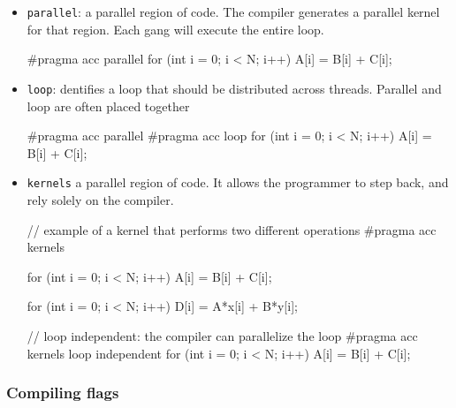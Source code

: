 \begin{itemize}
\item \texttt{parallel}: a parallel region of code. The compiler generates a parallel kernel for that region. Each gang will execute the entire loop.

\begin{codeblock}[language=C]
#pragma acc parallel
{
    for (int i = 0; i < N; i++)
        A[i] = B[i] + C[i];
}
\end{codeblock}

\item \texttt{loop}: dentiﬁes a loop that should be distributed across threads. Parallel and loop are often placed together

\begin{codeblock}[language=C]
#pragma acc parallel
{
    #pragma acc loop
    for (int i = 0; i < N; i++)
        A[i] = B[i] + C[i];
}
\end{codeblock}

\item \texttt{kernels} a parallel region of code. It allows the programmer to step back, and rely solely on the compiler.

\begin{codeblock}[language=C]
// example of a kernel that performs two different operations
#pragma acc kernels
{
    for (int i = 0; i < N; i++)
        A[i] = B[i] + C[i];

    for (int i = 0; i < N; i++)
        D[i] = A*x[i] + B*y[i];
}

// loop independent: the compiler can parallelize the loop
#pragma acc kernels loop independent
{
    for (int i = 0; i < N; i++)
        A[i] = B[i] + C[i];
}
\end{codeblock}
\end{itemize}

\subsubsection{Compiling flags}

